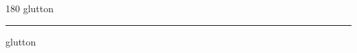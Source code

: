
\begin{frame}
\begin{center}
\begin{turn}{180}
{\fontsize{2.5cm}{1em}\selectfont glutton}
\end{turn}
\vspace{1em}\par  
\hrule
\vspace{1em}\par  
{\fontsize{2.5cm}{1em}\selectfont glutton}
\end{center}
\end{frame}
